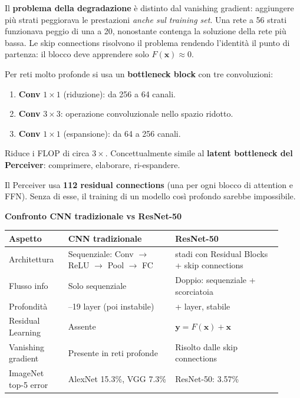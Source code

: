 \documentclass[
  11pt,
]{article}
\newcounter{none} %
\begin{document}
\begin{notabox}[title={\textbf{Degradazione vs vanishing gradient}}]
Il \textbf{problema della degradazione} è distinto dal vanishing gradient: aggiungere più strati peggiorava le prestazioni \emph{anche sul training set}. Una rete a 56 strati funzionava peggio di una a 20, nonostante contenga la soluzione della rete più bassa. Le skip connections risolvono il problema rendendo l'identità il punto di partenza: il blocco deve apprendere solo $F(\mathbf{x}) \approx 0$.
\end{notabox}

\begin{notabox}[title={\textbf{Bottleneck block (ResNet-50+)}}]
Per reti molto profonde si usa un \textbf{bottleneck block} con tre convoluzioni:
\begin{enumerate}
\item \textbf{Conv} $1 \times 1$ (riduzione): da 256 a 64 canali.
\item \textbf{Conv} $3 \times 3$: operazione convoluzionale nello spazio ridotto.
\item \textbf{Conv} $1 \times 1$ (espansione): da 64 a 256 canali.
\end{enumerate}
Riduce i FLOP di circa $3\times$. Concettualmente simile al \textbf{latent bottleneck del Perceiver}: comprimere, elaborare, ri-espandere.
\end{notabox}

\begin{notabox}[title={\textbf{Collegamento al Perceiver}}]
Il Perceiver usa \textbf{112 residual connections} (una per ogni blocco di attention e FFN). Senza di esse, il training di un modello così profondo sarebbe impossibile.
\end{notabox}

\textbf{Confronto CNN tradizionale vs ResNet-50}

{\def\LTcaptype{none}
\begin{longtable}{@{}
  >{\raggedright\arraybackslash}p{0.20\linewidth}
  >{\raggedright\arraybackslash}p{0.36\linewidth}
  >{\raggedright\arraybackslash}p{0.36\linewidth}@{}}
\toprule
\textbf{Aspetto} & \textbf{CNN tradizionale} & \textbf{ResNet-50} \\
\midrule\endhead
\bottomrule\endlastfoot
Architettura & Sequenziale: Conv $\to$ ReLU $\to$ Pool $\to$ FC & 5 stadi con Residual Blocks + skip connections \\
Flusso info & Solo sequenziale & Doppio: sequenziale + scorciatoia \\
Profondit\`a & 5--19 layer (poi instabile) & 50+ layer, stabile \\
Residual Learning & Assente & $\mathbf{y} = F(\mathbf{x}) + \mathbf{x}$ \\
Vanishing gradient & Presente in reti profonde & Risolto dalle skip connections \\
ImageNet top-5 error & AlexNet 15.3\%, VGG 7.3\% & ResNet-50: 3.57\% \\
\end{longtable}
}
\end{document}
